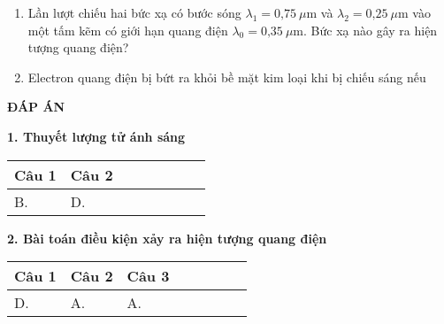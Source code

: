 \begin{enumerate}
	\item Lần lượt chiếu hai bức xạ có bước sóng $\lambda_1=\text{0,75}\ \mu \text{m}$ và $\lambda_2=\text{0,25}\ \mu \text{m}$ vào một tấm kẽm có giới hạn quang điện $\lambda_0=\text{0,35}\ \mu \text{m}$. Bức xạ nào gây ra hiện tượng quang điện?
	
	\item Electron quang điện bị bứt ra khỏi bề mặt kim loại khi bị chiếu sáng nếu
	
	
\end{enumerate}
\begin{center}
	\textbf{ĐÁP ÁN}
	
\end{center}

\textbf{1. Thuyết lượng tử ánh sáng}

\begin{longtable}[\textwidth]{|p{}|p{}|p{}|p{}|p{}|p{}|p{}|p{}|}
	\hline%
	\multicolumn{1}{|c|}{\textbf{Câu 1}} & \multicolumn{1}{c|}{\textbf{Câu 2}} & \multicolumn{1}{c|}{\textbf{}} &
	\multicolumn{1}{c|}{\textbf{}} &
	\multicolumn{1}{c|}{\textbf{}} &
	\multicolumn{1}{c|}{\textbf{}} &
	\multicolumn{1}{c|}{\textbf{}} &
	\multicolumn{1}{c|}{\textbf{}}\\
	\hline
	B. &D. & & & & & & \\
	\hline
\end{longtable}	


\textbf{2. Bài toán điều kiện xảy ra hiện tượng quang điện}
\begin{longtable}[\textwidth]{|p{}|p{}|p{}|p{}|p{}|p{}|p{}|p{}|}
	\hline%
	\multicolumn{1}{|c|}{\textbf{Câu 1}} & \multicolumn{1}{c|}{\textbf{Câu 2}} & \multicolumn{1}{c|}{\textbf{Câu 3}} &
	\multicolumn{1}{c|}{\textbf{}} &
	\multicolumn{1}{c|}{\textbf{}} &
	\multicolumn{1}{c|}{\textbf{}} &
	\multicolumn{1}{c|}{\textbf{}} &
	\multicolumn{1}{c|}{\textbf{}}\\
	\hline
	D. &A. &A. & & & & & \\
	\hline
\end{longtable}	


